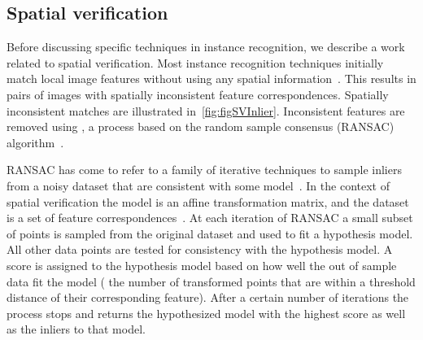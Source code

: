     \subsection{Spatial verification}\label{subsec:sverreview}

        Before discussing specific techniques in instance recognition,
          we describe a work related to spatial verification.
        Most instance recognition techniques initially match local
          image features without using any spatial
          information~\cite{lowe_distinctive_2004,sivic_efficient_2009,philbin_object_2007,tolias_image_2015}.
        This results in pairs of images with spatially inconsistent
          feature correspondences.
        Spatially inconsistent matches are illustrated
          in~\cref{fig:figSVInlier}.
        Inconsistent features are removed using , a process based on the random sample consensus
          (RANSAC) algorithm~\cite{fischler_random_1981}.

        RANSAC has come to refer to a family of iterative techniques to
          sample inliers from a noisy dataset that are consistent with
          some model~\cite{fischler_random_1981, hartley_multiple_2003,
          chum_locally_2003, raguram_usac_2013}.
        In the context of spatial verification the model is an affine
          transformation matrix, and the dataset is a set of feature
          correspondences~\cite{lowe_distinctive_2004, sivic_video_2003,
          philbin_object_2007, chum_total_2011, arandjelovic_three_2012}.
        At each iteration of RANSAC a small subset of points is sampled
          from the original dataset and used to fit a hypothesis model.
        All other data points are tested for consistency with the
          hypothesis model.
        A score is assigned to the hypothesis model based on how well
          the out of sample data fit the model (\eg{} the number of
          transformed points that are within a threshold distance of
          their corresponding feature).
        After a certain number of iterations the process stops and
          returns the hypothesized model with the highest score as well
          as the inliers to that model.


